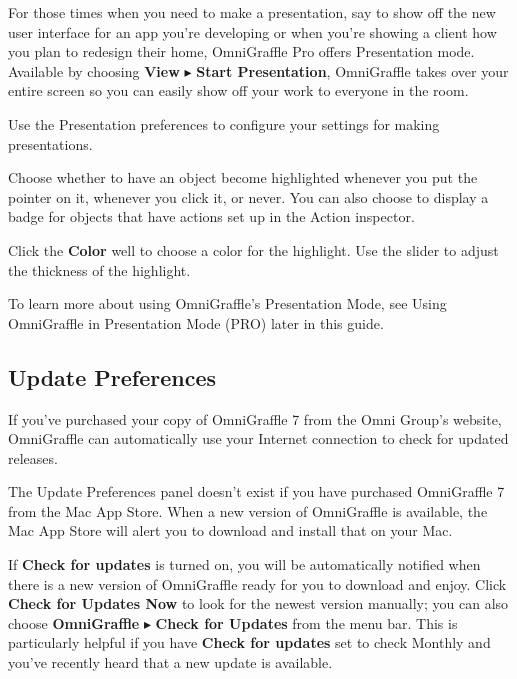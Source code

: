 \documentclass[../main.tex]{subfiles}
\begin{document}
\begin{ogpro}
  For those times when you need to make a presentation, say to show off the new user interface for
  an app you're developing or when you're showing a client how you plan to redesign their home,
  OmniGraffle Pro offers Presentation mode. Available by choosing \textbf{View}
  $\blacktriangleright$ \textbf{Start Presentation}, OmniGraffle takes over your entire screen
  so you can easily show off your work to everyone in the room.

  Use the Presentation preferences to configure your settings for making presentations.


  \begin{description}[style=nextline]
    \item[{Highlight Behavior}] Choose whether to have an object become highlighted whenever you
      put the pointer on it, whenever you click it, or never. You can also choose to display a
      badge for objects that have actions set up in the Action inspector.
    \item[{Highlight Appearance}] Click the \textbf{Color} well
       to choose a color for the highlight.
      Use the slider to adjust the thickness of the highlight.
  \end{description}

  To learn more about using OmniGraffle's Presentation Mode, see Using OmniGraffle in
  Presentation Mode (PRO) later in this guide.
\end{ogpro}

\subsection{Update Preferences}

If you've purchased your copy of OmniGraffle 7 from the Omni Group's website, OmniGraffle can
automatically use your Internet connection to check for updated releases.

\begin{ognote}
  The Update Preferences panel doesn't exist if you have purchased OmniGraffle 7 from the Mac App
  Store. When a new version of OmniGraffle is available, the Mac App Store will alert you to
  download and install that on your Mac.
\end{ognote}

If \textbf{Check for updates} is turned on, you will be automatically notified when there is a
new version of OmniGraffle ready for you to download and enjoy. Click \textbf{Check for
Updates Now} to look for the newest version manually; you can also choose \textbf{OmniGraffle}
$\blacktriangleright$ \textbf{Check for Updates} from the menu bar. This is particularly
helpful if you have \textbf{Check for updates} set to check Monthly and you've recently heard
that a new update is available.
\end{document}
